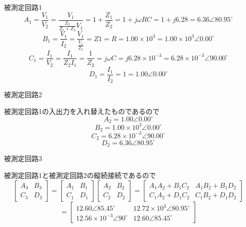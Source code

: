     \begin{description}
        \item 被測定回路1
        $$
        A_1=\frac{V_1}{V_2}=\frac{V_1}{\frac{Z_2}{Z_1+Z_2}V_1}=1+\frac{Z_1}{Z_2}=1+j\omega RC=1+j6.28=6.36\angle80.95^\circ
        $$
        $$
        B_1=\frac{V_1}{I_2}=\frac{V_1}{\frac{V_1}{Z_1}}=Z1=R=1.00\times10^3=1.00\times10^3\angle0.00^\circ
        $$
        $$
        C_1=\frac{I_1}{V_2}=\frac{I_1}{Z_2I_1}=\frac{1}{Z_2}=j\omega C=j6.28\times10^{-3}=6.28\times10^{-3}\angle90.00^\circ
        $$
        $$
        D_1=\frac{I_1}{I_2}=1=1.00\angle0.00^\circ
        $$
        \item 被測定回路2
        
        被測定回路1の入出力を入れ替えたものであるので
        $$
        A_2=1.00\angle0.00^\circ
        $$
        $$
        B_2=1.00\times10^3\angle0.00^\circ
        $$
        $$
        C_2=6.28\times10^{-3}\angle90.00^\circ
        $$
        $$
        D_2=6.36\angle80.95^\circ
        $$
        \item 被測定回路3
        
        被測定回路1と被測定回路2の縦続接続であるので
        $$
        \left[\begin{array}{ll}
        A_3 & B_3 \\
        C_3 & D_3
        \end{array}\right]=\left[\begin{array}{ll}
        A_1 & B_1 \\
        C_1 & D_1
        \end{array}\right]\left[\begin{array}{ll}
        A_2 & B_2 \\
        C_2 & D_2
        \end{array}\right]=\left[\begin{array}{ll}
        A_1A_2+B_1C_2 & A_1B_2+B_1D_2 \\
        C_1A_2+D_1C_2 & C_1B_2+D_1D_2
        \end{array}\right]
        $$
        $$
        =\left[\begin{array}{ll}
        12.60\angle85.45^\circ & 12.72\times10^3\angle80.95^\circ \\
        12.56\times10^{-3}\angle90^\circ & 12.60\angle85.45^\circ
        \end{array}\right]
        $$
    \end{description}

\newpage

